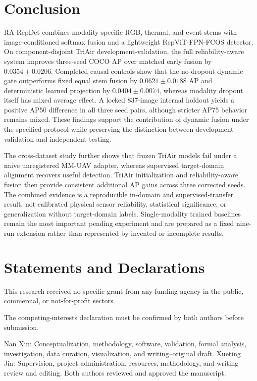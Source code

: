\section{Conclusion}
RA-RepDet combines modality-specific RGB, thermal, and event stems with image-conditioned softmax fusion and a lightweight RepViT-FPN-FCOS detector. On component-disjoint TriAir development-validation, the full reliability-aware system improves three-seed COCO AP over matched early fusion by $0.0354\pm0.0206$. Completed causal controls show that the no-dropout dynamic gate outperforms fixed equal stem fusion by $0.0621\pm0.0188$ AP and deterministic learned projection by $0.0404\pm0.0074$, whereas modality dropout itself has mixed average effect. A locked 837-image internal holdout yields a positive AP50 difference in all three seed pairs, although stricter AP75 behavior remains mixed. These findings support the contribution of dynamic fusion under the specified protocol while preserving the distinction between development validation and independent testing.

The cross-dataset study further shows that frozen TriAir models fail under a naive unregistered MM-UAV adapter, whereas supervised target-domain alignment recovers useful detection. TriAir initialization and reliability-aware fusion then provide consistent additional AP gains across three corrected seeds. The combined evidence is a reproducible in-domain and supervised-transfer result, not calibrated physical sensor reliability, statistical significance, or generalization without target-domain labels. Single-modality trained baselines remain the most important pending experiment and are prepared as a fixed nine-run extension rather than represented by invented or incomplete results.

\section*{Statements and Declarations}
This research received no specific grant from any funding agency in the public, commercial, or not-for-profit sectors.

The competing-interests declaration must be confirmed by both authors before submission.

Nan Xin: Conceptualization, methodology, software, validation, formal analysis, investigation, data curation, visualization, and writing--original draft. Xueting Jin: Supervision, project administration, resources, methodology, and writing--review and editing. Both authors reviewed and approved the manuscript.

